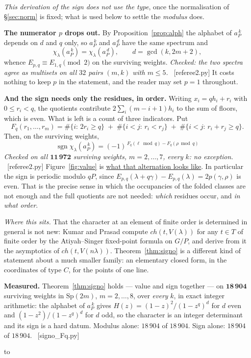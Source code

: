 \documentclass[11pt,a4paper]{article}
\theoremstyle{definition}
\newcommand{\Sp}{\mathrm{Sp}}
\newcommand{\ver}[1]{\unskip\penalty0\ \textcolor{azul}{\small\textsf{[#1]}}}
\newenvironment{keybox}
  {\par\vspace{9pt}\begin{lrbox}{\fichabox}%
   \begin{minipage}{0.90\textwidth}\vspace{7pt}\setlength{\parskip}{3pt}}
  {\vspace{7pt}\end{minipage}\end{lrbox}%
   \par\noindent\hbox to \textwidth{\hfill
   \textcolor{azul}{\rule[-\dp\fichabox]{3.2pt}{\dimexpr\ht\fichabox+\dp\fichabox\relax}}%
   \colorbox{fondoficha}{\usebox{\fichabox}}\hfill}%
   \par\vspace{9pt}}
\begin{document}
\noindent \emph{This derivation of the sign does not use the type}, once the normalisation of
\S\ref{sec:norm} is fixed; what is used below to settle the \emph{modulus} does.

\smallskip
\noindent \textbf{The numerator $p$ drops out.} By Proposition~\ref{prop:alph} the alphabet of
$a_P^{\,k}$ depends on $d$ and $q$ only, so $a_P^{\,k}$ and $a_P^{\,d}$ have the same spectrum and
\[
\chi_\lambda(a_P^{\,k})=\chi_\lambda(a_P^{\,d}),\qquad d=\gcd(k,2m+2),
\]
whence $E_{p,q}\equiv E_{1,q}\pmod 2$ on the surviving weights. \emph{Checked: the two spectra agree
as multisets on all $32$ pairs $(m,k)$ with $m\le5$.} \ver{referee2.py} It costs nothing to keep
$p$ in the statement, and the reader may set $p=1$ throughout.

\smallskip
\noindent \textbf{And the sign needs only the residues, in order.} Writing $x_i=qh_i+r_i$ with
$0\le r_i<q$, the quotients contribute $2\sum_i(m-i+1)h_i$ to the sum of floors, which is even. What
is left is a count of three indicators. Put
\[
F_q(r_1,\dots,r_m)=\#\{i:\,2r_i\ge q\}
\;+\;\#\{i<j:\,r_i<r_j\}
\;+\;\#\{i<j:\,r_i+r_j\ge q\} .
\]
Then, on the surviving weights,
\[
\boxed{\;\operatorname{sgn}\chi_\lambda(a_P^{\,k})
=(-1)^{\,F_q(\ell\bmod q)-F_q(\rho\bmod q)}\;}
\]
\emph{Checked on all $\mathbf{11\,972}$ surviving weights, $m=2,\dots,7$, every $k$: no exception.}
\ver{referee2.py} Figure~\ref{fig:value} is \href{https://karlesmarin.github.io/blueprints/characters-at-aP/index.html?lab=thm\%3Asigno\#thm:signo}{what that alternation looks like}. In particular the sign
is periodic modulo $qP$, since
$E_{p,q}(\lambda+q\gamma)-E_{p,q}(\lambda)=2p(\gamma,\rho)$ is even. That is the precise sense in
which the occupancies of the folded classes are not enough and the full quotients are not needed:
\emph{which} residues occur, and \emph{in what order}.

\smallskip
\noindent \emph{Where this sits.} That the character at an element of finite order is determined in
general is not new: Kumar and Prasad \cite{KP24} compute $ch(t,V(\lambda))$ for any $t\in T$ of
finite order by the Atiyah--Singer fixed-point formula on $G/P$, and derive from it the asymptotics
of $ch(t,V(n\lambda))$. Theorem~\ref{thm:signo} is a different kind of statement about a much smaller
family: an elementary closed form, in the coordinates of type $C$, for the points of one line.

\begin{keybox}
\textbf{Measured.} Theorem~\ref{thm:signo} holds --- value and sign together --- on
$\mathbf{18\,904}$ surviving weights in $\Sp(2m)$, $m=2,\dots,8$, over \emph{every} $k$, in exact
integer arithmetic: the alphabet of $a_P^{\,k}$ gives $H(z)=(1-z)^2/(1-z^q)^d$ for $d$ even and
$(1-z^2)/(1-z^q)^d$ for $d$ odd, so the character is an integer determinant and its sign is a hard
datum. Modulus alone: $18\,904$ of $18\,904$. Sign alone: $18\,904$ of $18\,904$.
\ver{signo\_Fq.py}
\end{keybox}
\end{document}
